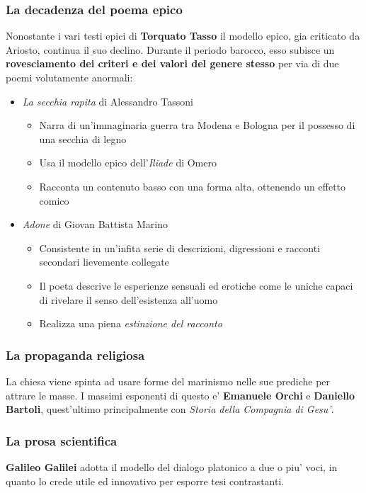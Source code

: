 \documentclass{article}
\begin{document}
{    \subsubsection{La decadenza del poema epico} %
    Nonostante i vari testi epici di \textbf{Torquato Tasso} il modello epico, gia criticato da Ariosto, continua il suo declino. Durante il periodo barocco, esso subisce un \textbf{rovesciamento dei criteri e dei valori del genere stesso} per via di due poemi volutamente anormali:
    
    \begin{itemize}
      \item \textit{La secchia rapita} di Alessandro Tassoni
      \begin{itemize}
        \item Narra di un'immaginaria guerra tra Modena e Bologna per il possesso di una secchia di legno
        \item Usa il modello epico dell'\textit{Iliade} di Omero
        \item Racconta un contenuto basso con una forma alta, ottenendo un effetto comico
      \end{itemize}
      \item \textit{Adone} di Giovan Battista Marino
      \begin{itemize}
        \item Consistente in un'infita serie di descrizioni, digressioni e racconti secondari lievemente collegate
        \item Il poeta descrive le esperienze sensuali ed erotiche come le uniche capaci di rivelare il senso dell'esistenza all'uomo
        \item Realizza una piena \textit{estinzione del racconto}
      \end{itemize}
    \end{itemize}

    \subsubsection{La propaganda religiosa} %
    La chiesa viene spinta ad usare forme del marinismo nelle sue prediche per attrare le masse. I massimi esponenti di questo e' \textbf{Emanuele Orchi} e \textbf{Daniello Bartoli}, quest'ultimo principalmente con \textit{Storia della Compagnia di Gesu'}.

    \subsubsection{La prosa scientifica} %
    \textbf{Galileo Galilei} adotta il modello del dialogo platonico a due o piu' voci, in quanto lo crede utile ed innovativo per esporre tesi contrastanti.

}
\end{document}
